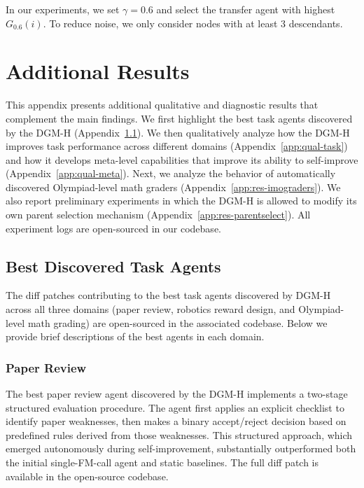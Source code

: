 In our experiments, we set $\gamma = 0.6$ and select the transfer agent with highest $G_{0.6}(i)$. To reduce noise, we only consider nodes with at least 3 descendants.

\section{Additional Results}
\label{app:res}

This appendix presents additional qualitative and diagnostic results that complement the main findings. We first highlight the best task agents discovered by the DGM-H (Appendix~\ref{app:best-agents}). We then qualitatively analyze how the DGM-H improves task performance across different domains (Appendix~\ref{app:qual-task}) and how it develops meta-level capabilities that improve its ability to self-improve (Appendix~\ref{app:qual-meta}). Next, we analyze the behavior of automatically discovered Olympiad-level math graders (Appendix~\ref{app:res-imograders}). We also report preliminary experiments in which the DGM-H is allowed to modify its own parent selection mechanism (Appendix~\ref{app:res-parentselect}). All experiment logs are open-sourced in our codebase.

\subsection{Best Discovered Task Agents}
\label{app:best-agents}

The diff patches contributing to the best task agents discovered by DGM-H across all three domains (paper review, robotics reward design, and Olympiad-level math grading) are open-sourced in the associated codebase. Below we provide brief descriptions of the best agents in each domain.

\subsubsection{Paper Review}
\label{app:best-agents-paperreview}

The best paper review agent discovered by the DGM-H implements a two-stage structured evaluation procedure. The agent first applies an explicit checklist to identify paper weaknesses, then makes a binary accept/reject decision based on predefined rules derived from those weaknesses. This structured approach, which emerged autonomously during self-improvement, substantially outperformed both the initial single-FM-call agent and static baselines. The full diff patch is available in the open-source codebase.

